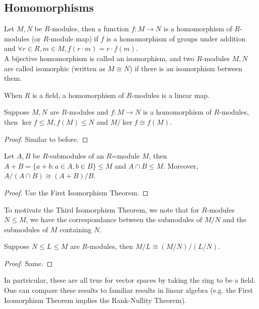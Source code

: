 \subsection{Homomorphisms}
\begin{definition}
    Let $M,N$ be $R$-modules, then a function $f:M\to N$ is a homomorphism of $R$-modules (or $R$-module map) if $f$ is a homomorphism of groups under addition and $\forall r\in R,m\in M,f(r\cdot m)=r\cdot f(m)$.\\
    A bijective homomorphism is called an isomorphism, and two $R$-modules $M,N$ are called isomorphic (written as $M\cong N$) if there is an isomorphism between them.
\end{definition}
\begin{example}
    When $R$ is a field, a homomorphism of $R$-modules is a linear map.
\end{example}
\begin{theorem}
    Suppose $M,N$ are $R$-modules and $f:M\to N$ is a homomorphism of $R$-modules, then $\ker f\le M,f(M)\le N$ and $M/\ker f\cong f(M)$.
\end{theorem}
\begin{proof}
    Similar to before.
\end{proof}
\begin{theorem}
    Let $A,B$ be $R$-submodules of an $R$=module $M$, then $A+B=\{a+b:a\in A,b\in B\}\le M$ and $A\cap B\le M$.
    Moreover, $A/(A\cap B)\cong (A+B)/B$.
\end{theorem}
\begin{proof}
    Use the First Isomorphism Theorem.
\end{proof}
To motivate the Third Isomorphism Theorem, we note that for $R$-modules $N\le M$, we have the correspondance between the submodules of $M/N$ and the submodules of $M$ containing $N$.
\begin{theorem}
    Suppose $N\le L\le M$ are $R$-modules, then $M/L\cong (M/N)/(L/N)$.
\end{theorem}
\begin{proof}
    Same.
\end{proof}
In partricular, these are all true for vector spaces by taking the ring to be a field.
One can compare these results to familiar results in linear algebra (e.g. the First Isomorphism Theorem implies the Rank-Nullity Theorem).
